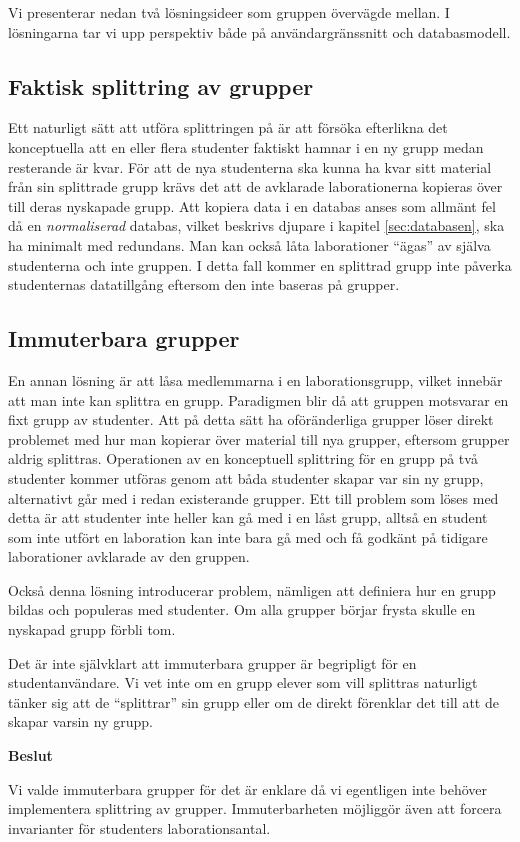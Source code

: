 Vi presenterar nedan två lösningsideer som gruppen övervägde mellan. I lösningarna tar vi upp perspektiv både på användargränssnitt och databasmodell.

\subsection{Faktisk splittring av grupper}
Ett naturligt sätt att utföra splittringen på är att försöka efterlikna det
konceptuella att en eller flera studenter faktiskt hamnar i en ny grupp medan
resterande är kvar. För att de nya studenterna ska kunna ha kvar sitt material
från sin splittrade grupp krävs det att de avklarade laborationerna kopieras
över till deras nyskapade grupp. Att kopiera data i en databas anses som
allmänt fel då en \emph{normaliserad} databas, vilket beskrivs djupare i
kapitel \ref{sec:databasen}, ska ha minimalt med redundans. Man kan också låta
laborationer “ägas” av själva studenterna och inte gruppen. I detta fall kommer
en splittrad grupp inte påverka studenternas datatillgång eftersom den inte
baseras på grupper.

\subsection{Immuterbara grupper}
En annan lösning är att låsa medlemmarna i en laborationsgrupp, vilket innebär att man inte kan splittra en grupp. Paradigmen blir då att gruppen motsvarar en fixt grupp av studenter. Att på detta sätt ha oföränderliga grupper löser direkt problemet med hur man kopierar över material till nya grupper, eftersom grupper aldrig splittras. Operationen av en konceptuell splittring för en grupp på två studenter kommer utföras genom att båda studenter skapar var sin ny grupp, alternativt går med i redan existerande grupper. Ett till problem som löses med detta är att studenter inte heller kan gå med i en låst grupp, alltså en student som inte utfört en laboration kan inte bara gå med och få godkänt på tidigare laborationer avklarade av den gruppen.

Också denna lösning introducerar problem, nämligen att definiera hur en grupp bildas och populeras med studenter. Om alla grupper börjar frysta skulle en nyskapad grupp förbli tom.

Det är inte självklart att immuterbara grupper är begripligt för en studentanvändare.  Vi vet inte om en grupp elever som vill splittras naturligt tänker sig att de “splittrar” sin grupp eller om de direkt förenklar det till att de skapar varsin ny grupp.

\begin{flushright}

  \textbf{Beslut}

  Vi valde immuterbara grupper för det är enklare då vi egentligen inte behöver implementera splittring av grupper. Immuterbarheten möjliggör även att forcera invarianter för studenters laborationsantal.
\end{flushright}
